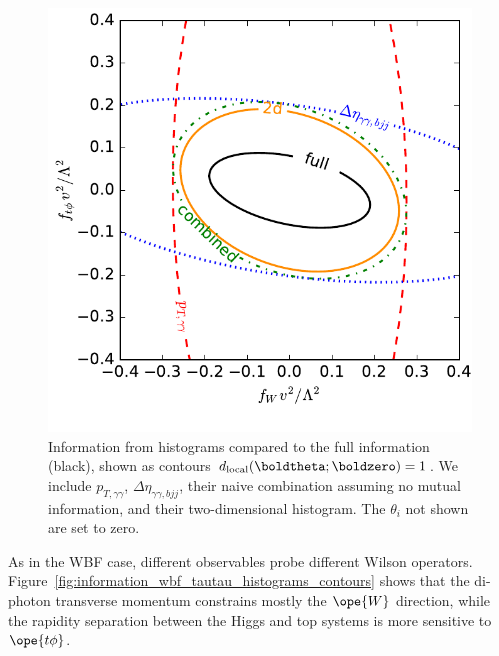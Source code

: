 \begin{figure}
  \includegraphics[height=0.45 \textwidth]{fig/information/th_histos_contours}
  \caption{Information from histograms compared to the full
    information (black), shown as contours
    $d_{\text{local}}(\boldtheta ; \boldzero) = 1$. We include
    $p_{T,\gamma \gamma}$, $\Delta \eta_{\gamma\gamma, bjj}$, their naive combination assuming
    no mutual information, and their two-dimensional histogram. The
    $\theta_i$ not shown are set to zero.}
  \label{fig:information_th_histograms_contours}
\end{figure}

As in the WBF case, different observables probe different Wilson
operators. Figure~\ref{fig:information_wbf_tautau_histograms_contours} shows that
the di-photon transverse momentum constrains mostly the $\ope{W}$
direction, while the rapidity separation between the Higgs and top
systems is more sensitive to $\ope{t\phi}$.

